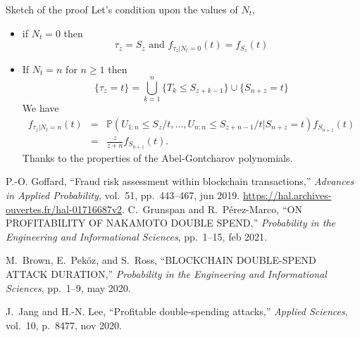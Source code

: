 \documentclass{beamer}
\begin{document}
\begin{frame}{Sketch of the proof}
\scriptsize
Let's condition upon the values of $N_t$,
\begin{itemize}
  \item if $N_t=0$ then 
  $$\tau_z = S_z\text{ and }f_{\tau_z|N_t=0}(t) = f_{S_z}(t)$$
  \item If $N_t = n$ for $n\geq 1$ then 
  $$
  \{\tau_z = t\} = \bigcup_{k = 1}^n\{T_k\leq S_{z+k-1}\}\cup\{S_{n+z} = t\}
  $$
We have 
\begin{eqnarray*}
f_{\tau_z|N_t = n}(t) &=& \mathbb{P}(U_{1:n}\leq S_z/t,\ldots,U_{n:n}\leq S_{z+n-1}/t\Big\rvert S_{n+z}=t)f_{S_{n+z}}(t)\\
&=&\frac{z}{z+n}f_{S_{n+z}}(t).
\end{eqnarray*}
Thanks to the properties of the Abel-Gontcharov polynomials.
\end{itemize}
\tiny
\begin{thebibliography}{1}

P.-O. Goffard, ``Fraud risk assessment within blockchain transactions,'' {\em
  Advances in Applied Probability}, vol.~51, pp.~443--467, jun 2019.
\newblock \url{https://hal.archives-ouvertes.fr/hal-01716687v2}.
C.~Grunspan and R.~P{\'{e}}rez-Marco, ``{ON} {PROFITABILITY} {OF} {NAKAMOTO}
  {DOUBLE} {SPEND},'' {\em Probability in the Engineering and Informational
  Sciences}, pp.~1--15, feb 2021.

M.~Brown, E.~Peköz, and S.~Ross, ``{BLOCKCHAIN} {DOUBLE}-{SPEND} {ATTACK}
  {DURATION},'' {\em Probability in the Engineering and Informational
  Sciences}, pp.~1--9, may 2020.

J.~Jang and H.-N. Lee, ``Profitable double-spending attacks,'' {\em Applied
  Sciences}, vol.~10, p.~8477, nov 2020.

\end{thebibliography}
\end{frame}
\end{document}
